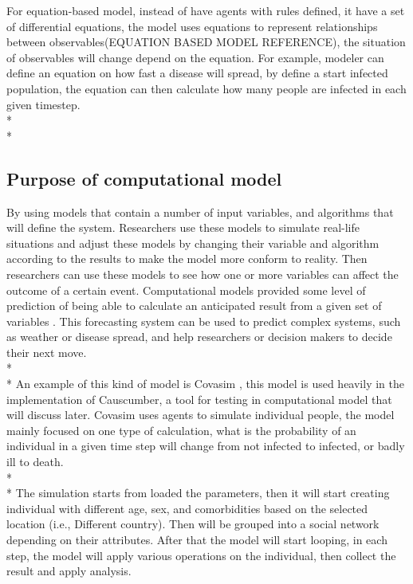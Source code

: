For equation-based model, instead of have agents with rules defined, it have a set of differential equations, the model uses equations to represent relationships between observables(EQUATION BASED MODEL REFERENCE), the situation of observables will change depend on the equation. For example, modeler can define an equation on how fast a disease will spread, by define a start infected population, the equation can then calculate how many people are infected in each given timestep. \\*\\*

\subsection{Purpose of computational model}
By using models that contain a number of input variables, and algorithms that will define the system. Researchers use these models to simulate real-life situations and adjust these models by changing their variable and algorithm according to the results to make the model more conform to reality. Then researchers can use these models to see how one or more variables can affect the outcome of a certain event. Computational models provided some level of prediction of being able to calculate an anticipated result from a given set of variables \cite{Reference4}. This forecasting system can be used to predict complex systems, such as weather or disease spread, and help researchers or decision makers to decide their next move.\\*\\*
An example of this kind of model is Covasim \cite{Reference5}, this model is used heavily in the implementation of Causcumber, a tool for testing in computational model that will discuss later. Covasim uses agents to simulate individual people, the model mainly focused on one type of calculation, what is the probability of an individual in a given time step will change from not infected to infected, or badly ill to death. \\*\\*
The simulation starts from loaded the parameters, then it will start creating individual with different age, sex, and comorbidities based on the selected location (i.e., Different country). Then will be grouped into a social network depending on their attributes. After that the model will start looping, in each step, the model will apply various operations on the individual, then collect the result and apply analysis.

